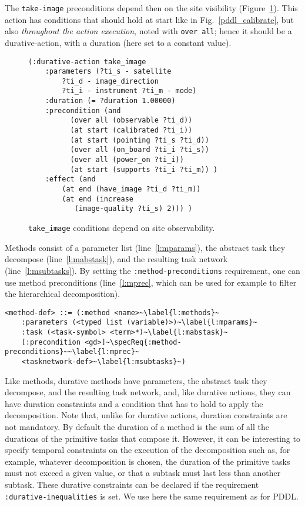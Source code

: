 \documentclass[letterpaper]{article} %
\begin{document}
 The \texttt{take-image} preconditions depend then on the site visibility (Figure~\ref{pddl_take-image}).
 This action has conditions that should hold at start like in Fig.~\ref{pddl_calibrate}, but also \emph{throughout the action execution}, noted with \texttt{over all}; hence it should be a durative-action, with a duration (here set to a constant value).

\begin{figure}[!h]
\begin{lstlisting}[language=pddl]
(:durative-action take_image
	:parameters (?ti_s - satellite
	    ?ti_d - image_direction
	    ?ti_i - instrument ?ti_m - mode)
	:duration (= ?duration 1.00000)
	:precondition (and
		  (over all (observable ?ti_d))
		  (at start (calibrated ?ti_i))
		  (at start (pointing ?ti_s ?ti_d))
		  (over all (on_board ?ti_i ?ti_s))
		  (over all (power_on ?ti_i))
		  (at start (supports ?ti_i ?ti_m))	)
	:effect	(and
		(at end (have_image ?ti_d ?ti_m))
		(at end (increase
		   (image-quality ?ti_s) 2))) )
\end{lstlisting}
\caption{\texttt{take\_image} conditions depend on site observability.\label{pddl_take-image}}
\end{figure}
%



%
%
Methods consist of a parameter list (line~\ref{l:mparams}), the abstract task they decompose (line~\ref{l:mabstask}), and the resulting task network (line~\ref{l:msubtasks}). By setting the \verb+:method-preconditions+ requirement, one can use method preconditions (line~\ref{l:mprec}, which can be used for example to filter the hierarchical decomposition).

\begin{lstlisting}[firstnumber=last, escapechar=~]
<method-def> ::= (:method <name>~\label{l:methods}~
    :parameters (<typed list (variable)>)~\label{l:mparams}~
    :task (<task-symbol> <term>*)~\label{l:mabstask}~
    [:precondition <gd>]~\specReq{:method-preconditions}~~\label{l:mprec}~
    <tasknetwork-def>~\label{l:msubtasks}~)
\end{lstlisting}

%
%
Like methods, durative methods have parameters, the abstract task they decompose, and the resulting task network, and, like durative actions, they can have duration constraints and a condition that has to hold to apply the decomposition. Note that, unlike for durative actions, duration constraints are not mandatory. By default the duration of a method is the sum of all the durations of the primitive tasks that compose it. However, it can be interesting to specify temporal constraints on the execution of the decomposition such as, for example, whatever decomposition is chosen, the duration of the primitive tasks must not exceed a given value, or that a subtask must last less than another subtask. These durative constraints can be declared if the requirement {\tt :durative-inequalities} is set. We use here the same requirement as for PDDL.
\end{document}
